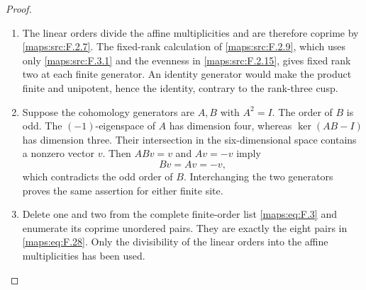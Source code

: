 \documentclass[11pt,a4paper]{article}
\theoremstyle{definition}
\begin{document}
\begin{proof}
\begin{enumerate}[label=\arabic*.]
\item The linear orders divide the affine multiplicities and are
therefore coprime by \ref{maps:src:F.2.7}.  The fixed-rank calculation
of \ref{maps:src:F.2.9}, which uses only \ref{maps:src:F.3.1} and the
evenness in \ref{maps:src:F.2.15}, gives fixed rank two at each finite
generator.  An identity generator would make the product finite and
unipotent, hence the identity, contrary to the rank-three cusp.

\item Suppose the cohomology generators are $A,B$ with $A^2=I$.
The order of $B$ is odd.  The $(-1)$-eigenspace of $A$ has dimension
four, whereas $\ker(AB-I)$ has dimension three.  Their intersection
in the six-dimensional space contains a nonzero vector $v$.
Then $ABv=v$ and $Av=-v$ imply
\[
 Bv=Av=-v,
\]
which contradicts the odd order of $B$.  Interchanging the two
generators proves the same assertion for either finite site.

\item Delete one and two from the complete finite-order list
\eqref{maps:eq:F.3} and enumerate its coprime unordered pairs.
They are exactly the eight pairs in \eqref{maps:eq:F.28}.
Only the divisibility of the linear orders into the affine
multiplicities has been used.
\end{enumerate}
\end{proof}
\end{document}
